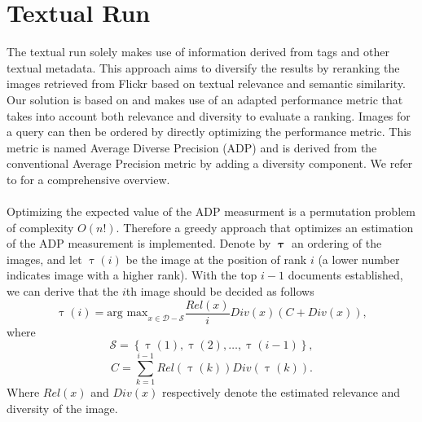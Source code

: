 \documentclass{acm_proc_article-me11_tweaked}
\begin{document}
\section{Textual Run}
The textual run solely makes use of information derived from tags and other textual metadata.
This approach aims to diversify the results by reranking the images retrieved from Flickr based on textual relevance and semantic similarity.
Our solution is based on \cite{textual-diversification} and makes use of an adapted performance metric that takes into account both relevance and diversity to evaluate a ranking.
Images for a query can then be ordered by directly optimizing the performance metric.
This metric is named Average Diverse Precision (ADP) and is derived from the conventional Average Precision metric by adding a diversity component.
We refer to \cite{textual-diversification} for a comprehensive overview.
\\\\
Optimizing the expected value of the ADP measurment is a permutation problem of complexity $O(n!)$. 
Therefore a greedy approach that optimizes an estimation of the ADP measurement is implemented. 
Denote by $\pmb\uptau$ an ordering of the images, and let $\uptau(i)$ be the image at the position of rank $i$ (a lower number indicates image with a higher rank).
With the top $ i - 1 $ documents established, we can derive that the $i$th image should be decided as follows
\begin{equation}
 \displaystyle
  \uptau(i) = \text{arg max}_{x \in \mathscr{D} - \mathscr{S} } \frac{Rel(x)}{i} Div(x) ( C + Div(x) ),
\end{equation}
where
\begin{equation}
\mathscr{S} = \left\{\uptau(1), \uptau(2), \ldots , \uptau(i - 1)\right\} ,
\end{equation}
\begin{equation}
C = \sum^{i-1}_{k=1} Rel(\uptau(k)) Div(\uptau(k)).
\end{equation}
Where $Rel(x)$ and $Div(x)$ respectively denote the estimated relevance and diversity of the image.

%
\end{document}

